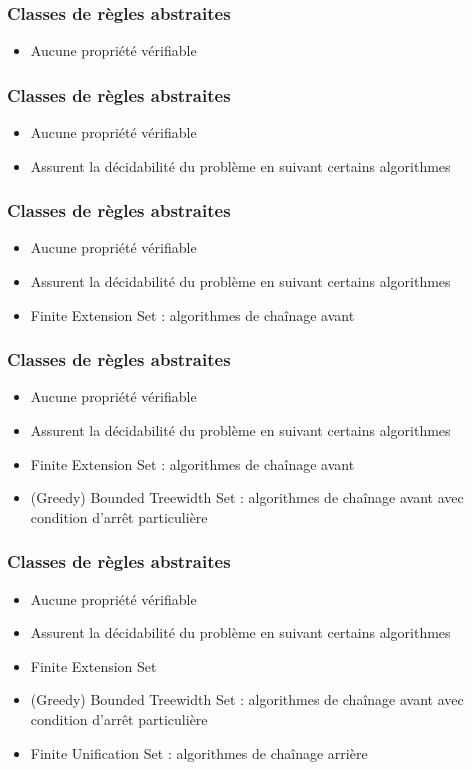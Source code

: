 
\begin{frame}[t]
	\frametitle{Classes de règles abstraites}
	\vspace{10mm}
	\begin{itemize}
		\item Aucune propriété vérifiable
	\end{itemize}
\end{frame}

\begin{frame}[t]
	\frametitle{Classes de règles abstraites}
	\vspace{10mm}
	\begin{itemize}
		\item Aucune propriété vérifiable
		\item Assurent la décidabilité du problème en suivant certains algorithmes
	\end{itemize}
\end{frame}

\begin{frame}[t]
	\frametitle{Classes de règles abstraites}
	\vspace{10mm}
	\begin{itemize}
		\item Aucune propriété vérifiable
		\item Assurent la décidabilité du problème en suivant certains algorithmes
		\item Finite Extension Set : algorithmes de chaînage avant
	\end{itemize}
\end{frame}

\begin{frame}[t]
	\frametitle{Classes de règles abstraites}
	\vspace{10mm}
	\begin{itemize}
		\item Aucune propriété vérifiable
		\item Assurent la décidabilité du problème en suivant certains algorithmes
		\item Finite Extension Set : algorithmes de chaînage avant
		\item (Greedy) Bounded Treewidth Set : algorithmes de chaînage avant avec condition
		d'arrêt particulière
	\end{itemize}
\end{frame}

\begin{frame}[t]
	\frametitle{Classes de règles abstraites}
	\vspace{10mm}
	\begin{itemize}
		\item Aucune propriété vérifiable
		\item Assurent la décidabilité du problème en suivant certains algorithmes
		\item Finite Extension Set
		\item (Greedy) Bounded Treewidth Set : algorithmes de chaînage avant avec condition
			d'arrêt particulière
		\item Finite Unification Set : algorithmes de chaînage arrière
	\end{itemize}
\end{frame}

